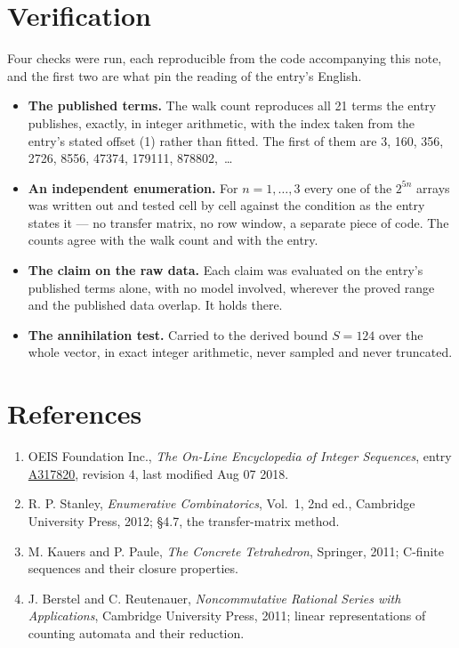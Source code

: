 \documentclass[11pt]{article}
\theoremstyle{definition}
\begin{document}
\section{Verification}

Four checks were run, each reproducible from the code accompanying this note, and the first two are what pin the reading of the entry's English.

\begin{itemize}

\item {\bfseries The published terms.} The walk count reproduces all 21 terms the entry publishes, exactly, in integer arithmetic, with the index taken from the entry's stated offset (1) rather than fitted. The first of them are 3, 160, 356, 2726, 8556, 47374, 179111, 878802,~\dots

\item {\bfseries An independent enumeration.} For $n = 1,\dots,3$ every one of the $2^{5n}$ arrays was written out and tested cell by cell against the condition as the entry states it --- no transfer matrix, no row window, a separate piece of code. The counts agree with the walk count and with the entry.

\item {\bfseries The claim on the raw data.} Each claim was evaluated on the entry's published terms alone, with no model involved, wherever the proved range and the published data overlap. It holds there.

\item {\bfseries The annihilation test.} Carried to the derived bound $S = 124$ over the whole vector, in exact integer arithmetic, never sampled and never truncated.

\end{itemize}

\section{References}

\begin{enumerate}

\item OEIS Foundation Inc., \emph{The On-Line Encyclopedia of Integer Sequences}, entry \href{https://oeis.org/A317820}{A317820}, revision 4, last modified Aug 07 2018.

\item R. P. Stanley, \emph{Enumerative Combinatorics}, Vol.~1, 2nd ed., Cambridge University Press, 2012; \S4.7, the transfer-matrix method.

\item M. Kauers and P. Paule, \emph{The Concrete Tetrahedron}, Springer, 2011; C-finite sequences and their closure properties.

\item J. Berstel and C. Reutenauer, \emph{Noncommutative Rational Series with Applications}, Cambridge University Press, 2011; linear representations of counting automata and their reduction.

\end{enumerate}
\end{document}
